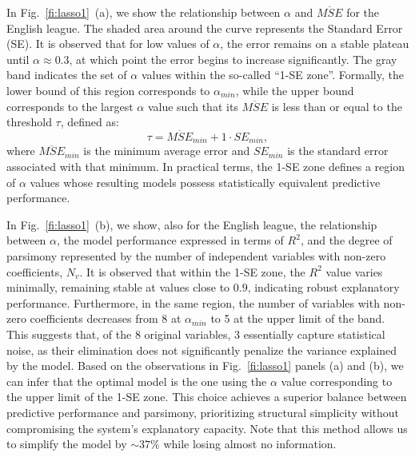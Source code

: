\documentclass[preprint,12pt]{elsarticle}
\begin{document}
{In Fig.~\ref{fi:lasso1}~(a), we show the relationship between $\alpha$ and $\overline{MSE}$ for the English league. The shaded area around the curve represents the Standard Error (SE). It is observed that for low values of $\alpha$, the error remains on a stable plateau until $\alpha \approx 0.3$, at which point the error begins to increase significantly. The gray band indicates the set of $\alpha$ values within the so-called ``1-SE zone''. Formally, the lower bound of this region corresponds to $\alpha_{min}$, while the upper bound corresponds to the largest $\alpha$ value such that its $\overline{MSE}$ is less than or equal to the threshold $\tau$, defined as:
%
\begin{equation}
\tau = \overline{MSE}_{min} + 1 \cdot SE_{min},
\end{equation}
%
where $\overline{MSE}_{min}$ is the minimum average error and $SE_{min}$ is the standard error associated with that minimum. In practical terms, the 1-SE zone defines a region of $\alpha$ values whose resulting models possess statistically equivalent predictive performance.

In Fig.~\ref{fi:lasso1}~(b), we show, also for the English league, the relationship between $\alpha$, the model performance expressed in terms of $R^2$, and the degree of parsimony represented by the number of independent variables with non-zero coefficients, $N_v$.
%
It is observed that within the 1-SE zone, the $R^2$ value varies minimally, remaining stable at values close to $0.9$, indicating robust explanatory performance. Furthermore, in the same region, the number of variables with non-zero coefficients decreases from 8 at $\alpha_{min}$ to 5 at the upper limit of the band. This suggests that, of the 8 original variables, 3 essentially capture statistical noise, as their elimination does not significantly penalize the variance explained by the model.
%
Based on the observations in Fig.~\ref{fi:lasso1} panels (a) and (b), we can infer that the optimal model is the one using the $\alpha$ value corresponding to the upper limit of the 1-SE zone. This choice achieves a superior balance between predictive performance and parsimony, prioritizing structural simplicity without compromising the system's explanatory capacity. Note that this method allows us to simplify the model by $\sim 37\%$ while losing almost no information.

}
\end{document}
